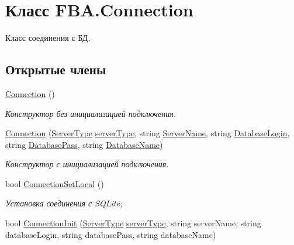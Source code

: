 \hypertarget{class_f_b_a_1_1_connection}{}\section{Класс F\+B\+A.\+Connection}
\label{class_f_b_a_1_1_connection}


Класс соединения с БД.  


\subsection*{Открытые члены}
\begin{DoxyCompactItemize}
\item 
\mbox{\hyperlink{class_f_b_a_1_1_connection_ae4e944521bb94857288224ca9f20245a}{Connection}} ()
\begin{DoxyCompactList}\small\item\em Конструктор без инициализацией подключения. \end{DoxyCompactList}\item 
\mbox{\hyperlink{class_f_b_a_1_1_connection_a085fd480090159a0192a3cfdc2075574}{Connection}} (\mbox{\hyperlink{namespace_f_b_a_a54b34d51226fe01d01f79d9fcb237413}{Server\+Type}} \mbox{\hyperlink{class_f_b_a_1_1_connection_ad5c6e7969020c242db56e1910c6e353f}{server\+Type}}, string \mbox{\hyperlink{class_f_b_a_1_1_connection_a6a04e4e09b3be5fc37491234ccf46a61}{Server\+Name}}, string \mbox{\hyperlink{class_f_b_a_1_1_connection_aa20952e5caba14009de078611bffc06e}{Database\+Login}}, string \mbox{\hyperlink{class_f_b_a_1_1_connection_afb9f211ad33869d0d3ff480a8593cba0}{Database\+Pass}}, string \mbox{\hyperlink{class_f_b_a_1_1_connection_a7af426539c14090db733c18b37cfc1f5}{Database\+Name}})
\begin{DoxyCompactList}\small\item\em Конструктор с инициализацией подключения. \end{DoxyCompactList}\item 
bool \mbox{\hyperlink{class_f_b_a_1_1_connection_a226d4baf3be0676551817c1ae46fbaa9}{Connection\+Set\+Local}} ()
\begin{DoxyCompactList}\small\item\em Установка соединения с S\+Q\+Lite; \end{DoxyCompactList}\item 
bool \mbox{\hyperlink{class_f_b_a_1_1_connection_a35e9a07c0120bdca37b4a7459b7e6a21}{Connection\+Init}} (\mbox{\hyperlink{namespace_f_b_a_a54b34d51226fe01d01f79d9fcb237413}{Server\+Type}} \mbox{\hyperlink{class_f_b_a_1_1_connection_ad5c6e7969020c242db56e1910c6e353f}{server\+Type}}, string server\+Name, string database\+Login, string database\+Pass, string database\+Name)

\end{DoxyCompactItemize}
